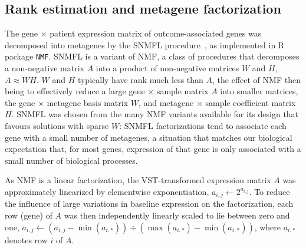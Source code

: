 \documentclass[dissertation.tex]{subfiles}
\begin{document}
\subsection{Rank estimation and metagene factorization}
\label{subsec:sigs-nmf}
The gene $\times$ patient expression matrix of outcome-associated genes was decomposed into metagenes by the \gls{SNMFL} procedure~\cite{Kim2007}, as implemented in R package \texttt{NMF}.  \gls{SNMFL} is a variant of \gls{NMF}, a class of procedures that decomposes a non-negative matrix $A$ into a product of non-negative matrices $W$ and $H$, $A \approx WH$.  $W$ and $H$ typically have rank much less than $A$, the effect of \gls{NMF} then being to effectively reduce a large gene $\times$ sample matrix $A$ into smaller matrices, the gene $\times$ metagene basis matrix $W$, and metagene $\times$ sample coefficient matrix $H$.  \gls{SNMFL} was chosen from the many \gls{NMF} variants available for its design that favours solutions with sparse $W$: \gls{SNMFL} factorizations tend to associate each gene with a small number of metagenes, a situation that matches our biological expectation that, for most genes, expression of that gene is only associated with a small number of biological processes.

As \gls{NMF} is a linear factorization, the \gls{VST}-transformed expression matrix $A$ was approximately linearized by elementwise exponentiation, $a_{i,j} \leftarrow 2^{a_{i,j}}$.  To reduce the influence of large variations in baseline expression on the factorization, each row (gene) of $A$ was then independently linearly scaled to lie between zero and one, $a_{i,j} \leftarrow (a_{i,j} - \min(a_{i,*})) \div (\max(a_{i,*}) - \min(a_{i,*}))$, where $a_{i,*}$ denotes row $i$ of $A$.
\end{document}
